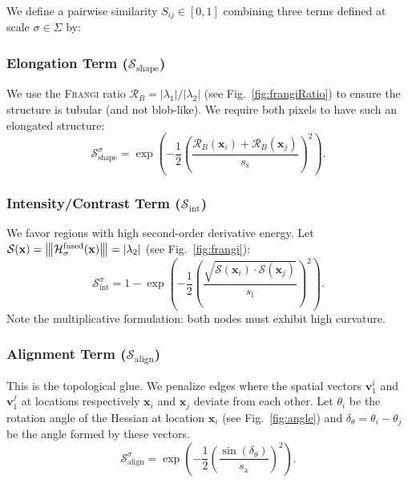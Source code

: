 \documentclass[conference]{IEEEtran}
\newcommand{\Frangi}[0]{\textsc{Frangi}}
\newcommand{\Hess}[0]{\mathcal{H}}
\newcommand{\matnorm}[1]{%
  \left\lvert\mkern-2mu\left\lvert\mkern-2mu\left\lvert #1 \right\rvert\mkern-2mu\right\rvert\mkern-2mu\right\rvert
}%
\begin{document}
We define a pairwise similarity $S_{ij} \in [0, 1]$ combining three terms defined at scale $\sigma \in\Sigma$ by:

\subsubsection{Elongation Term ($\mathcal{S}_{\mathrm{shape}}$)}
We use the \Frangi{} ratio $\mathcal{R}_B = |\lambda_1| / |\lambda_2|$ (see Fig.~\ref{fig:frangiRatio}) to ensure the structure is tubular (and not blob-like). We require both pixels to have such an elongated structure:
\begin{equation}
    \mathcal{S}_{\text{shape}}^{\sigma} = \exp\left( - \frac12 \left(\frac{\mathcal{R}_B(\mathbf{x}_i) + \mathcal{R}_B(\mathbf{x}_j)}{s_{\mathrm{s}}}\right)^2 \right).
\end{equation}



\subsubsection{Intensity/Contrast Term ($\mathcal{S}_{\mathrm{int}}$)}
We favor regions with high second-order derivative energy. Let $\mathcal{S}(\mathbf{x}) = \matnorm{ \Hess_{\sigma}^{\text{fused}}(\mathbf{x}) } = |\lambda_2|$ (see Fig.~\ref{fig:frangi}):
\begin{equation}
    \mathcal{S}_{\text{int}}^{\sigma} = 1 - \exp\left( - \frac12 \left(\frac{\sqrt{\mathcal{S}(\mathbf{x}_i) \cdot \mathcal{S}(\mathbf{x}_j)}}{s_{\mathrm{i}}}\right)^2 \right).
\end{equation}
Note the multiplicative formulation: both nodes must exhibit high curvature.

\subsubsection{Alignment Term ($\mathcal{S}_{\mathrm{align}}$)}
This is the topological glue. We penalize edges where the spatial vectors $\mathbf{v}_1^i$ and $\mathbf{v}_1^j$ at locations respectively $\mathbf{x}_i $ and $\mathbf{x}_j$ deviate from each other. 
Let $\theta_i$ be the rotation angle of the Hessian at location $\mathbf x_i$ (see Fig.~\ref{fig:angle}) and $\delta_\theta = \theta_i - \theta_j$ be the angle formed by these vectors.
\begin{equation}
    \mathcal{S}_{\text{align}}^{\sigma} = \exp\left( - \frac12\left( \frac{\sin (\delta_\theta)}{s_{\mathrm{a}}}\right)^2\right).
\end{equation}
\end{document}
